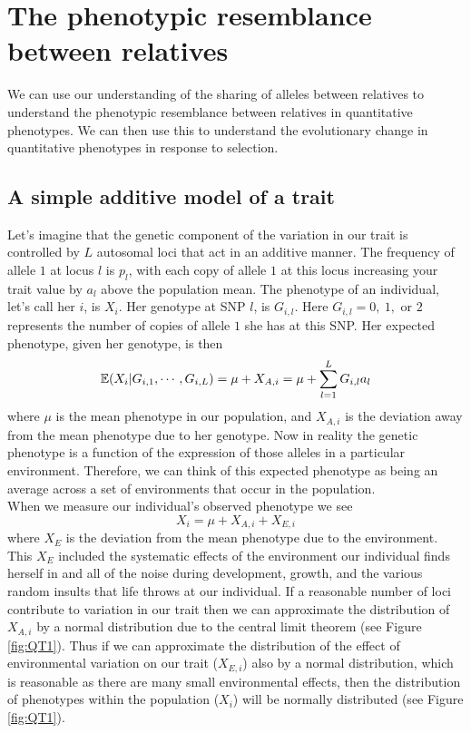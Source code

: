 \section{The phenotypic resemblance between relatives}

We can use our understanding of the sharing of alleles between relatives
to understand the phenotypic resemblance between relatives in
quantitative phenotypes. We can then use this to understand the
evolutionary change in quantitative phenotypes in response to selection. \\

\subsection{A simple additive model of a trait}
Let's imagine that the genetic component of the variation in our trait
is controlled by $L$ autosomal loci that act in an additive manner. The frequency of allele $1$ at locus $l$ is $p_l$, with each copy of
allele $1$ at this locus increasing your trait value by $a_l$ above
the population mean.
The phenotype of an individual, let's call her $i$, is $X_i$.
Her genotype at SNP $l$, is
$G_{i,l}$. Here $G_{i,l}=0,~1,$ or $2$  represents the number of copies of allele $1$ she
has at this SNP. Her expected phenotype, given her genotype, is then
\begin{equation}
\mathbb{E} (X_i | G_{i,1},\cdots,G_{i,L}) =\mu + X_{A,i} = \mu+\sum_{l=1}^L G_{i,l} a_{l} \label{pheno_geno}
\end{equation}
where $\mu$ is the mean phenotype in our population, and $X_{A,i}$ is
the deviation away from the mean phenotype due to her genotype. Now in reality the genetic phenotype is a function of the
expression of those alleles in a particular environment. Therefore, we
can think of this expected phenotype as being an average across a set
of environments that occur in the population. \\



When we measure our individual's observed phenotype we see
\begin{equation}
X_i =   \mu+X_{A,i} + X_{E,i} \label{pheno_geno_environ}
\end{equation}
where $X_E$ is the deviation from the mean phenotype due to the
environment. This $X_E$ included the systematic effects of the environment
our individual finds herself in and all of the noise during
development, growth, and the various random insults that life throws
at our individual. If a reasonable number of loci contribute to
variation in our trait then we can approximate the distribution of
$X_{A,i}$ by a normal distribution due to the central limit theorem (see Figure \ref{fig:QT1}). Thus if we can
approximate the distribution of the effect of environmental variation
on our trait ($X_{E,i}$) also by a normal distribution, which is
reasonable as there are many small environmental effects, then the
distribution of phenotypes within the population ($X_i$) will be
normally distributed (see Figure \ref{fig:QT1}).\\

